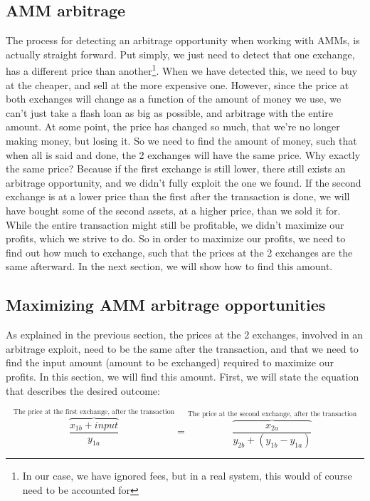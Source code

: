 \subsection{AMM arbitrage}
The process for detecting an arbitrage opportunity when working with AMMs, is
actually straight forward. Put simply, we just need to detect that one exchange, has
a different price than another\footnote{In our case, we have ignored fees, but
in a real system, this would of course need to be accounted for}. When we have
detected this, we need to buy at the cheaper, and sell at the more
expensive one. However, since the price at both exchanges will change
as a function of the amount of money we use, we can't just take a
flash loan as big as possible, and arbitrage
with the entire amount. At some point, the price has changed so much, that we're
no longer making money, but losing it. So we need to find the amount of
money, such that when all is said and done, the 2 exchanges will have the same
price. Why exactly the same price? Because if the first exchange is still
lower, there still exists an arbitrage opportunity, and we didn't fully exploit
the one we found. If the second exchange is at a
lower price than the first after the transaction is done, we will have
bought some of the second assets, at a
higher price, than we sold it for. While the entire transaction might
still be profitable, we didn't
maximize our profits, which we strive to do. So in order to maximize our
profits, we need to find out how much to exchange, such that the prices at the 2
exchanges are the same afterward. In the next section, we will show how to find
this amount.

\subsection{Maximizing AMM arbitrage opportunities}\label{maximizing}
As explained in the previous section, the prices at the 2
exchanges, involved in an arbitrage exploit, need to be the same after the
transaction, and that we need to find the input amount (amount to be
exchanged) required to
maximize our profits. In this section, we will find this amount. First, we will
state the equation that describes the desired outcome:

\begin{equation}
\overbrace{\frac{x_{1b} + input}{y_{1a}}}^{\text{The price at the
    first exchange, after the transaction}} = \overbrace{\frac{x_{2a}}{y_{2b} + (y_{1b} - y_{1a})}}^{\text{The price at the
    second exchange, after the transaction}}
\end{equation}

